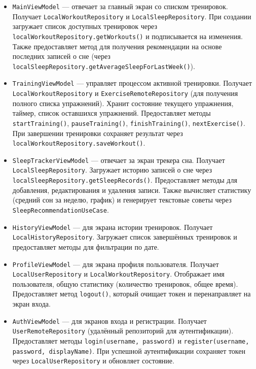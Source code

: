 \begin{itemize}
    \item \texttt{MainViewModel} — отвечает за главный экран со списком тренировок. Получает \texttt{LocalWorkoutRepository} и \texttt{LocalSleepRepository}. При создании загружает список доступных тренировок через \texttt{localWorkoutRepository.getWorkouts()} и подписывается на изменения. Также предоставляет метод для получения рекомендации на основе последних записей о сне (через \texttt{localSleepRepository.getAverageSleepForLastWeek()}).

    \item \texttt{TrainingViewModel} — управляет процессом активной тренировки. Получает \texttt{LocalWorkoutRepository} и \texttt{ExerciseRemoteRepository} (для получения полного списка упражнений). Хранит состояние текущего упражнения, таймер, список оставшихся упражнений. Предоставляет методы \texttt{startTraining()}, \texttt{pauseTraining()}, \texttt{finishTraining()}, \texttt{nextExercise()}. При завершении тренировки сохраняет результат через \texttt{localWorkoutRepository.saveWorkout()}.

    \item \texttt{SleepTrackerViewModel} — отвечает за экран трекера сна. Получает \texttt{LocalSleepRepository}. Загружает историю записей о сне через \texttt{localSleepRepository.getSleepRecords()}. Предоставляет методы для добавления, редактирования и удаления записи. Также вычисляет статистику (средний сон за неделю, график) и генерирует текстовые советы через \texttt{SleepRecommendationUseCase}.

    \item \texttt{HistoryViewModel} — для экрана истории тренировок. Получает \texttt{LocalHistoryRepository}. Загружает список завершённых тренировок и предоставляет методы для фильтрации по дате.

    \item \texttt{ProfileViewModel} — для экрана профиля пользователя. Получает \texttt{LocalUserRepository} и \texttt{LocalWorkoutRepository}. Отображает имя пользователя, общую статистику (количество тренировок, общее время). Предоставляет метод \texttt{logout()}, который очищает токен и перенаправляет на экран входа.

    \item \texttt{AuthViewModel} — для экранов входа и регистрации. Получает \texttt{UserRemoteRepository} (удалённый репозиторий для аутентификации). Предоставляет методы \texttt{login(username, password)} и \texttt{register(username, password, displayName)}. При успешной аутентификации сохраняет токен через \texttt{LocalUserRepository} и обновляет состояние.
\end{itemize}

